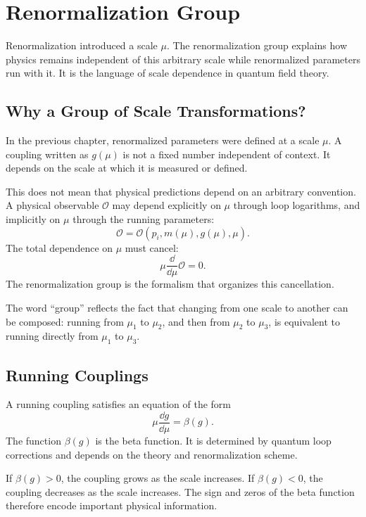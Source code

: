 \chapter{Renormalization Group}

\begin{remarkbox}
Renormalization introduced a scale \(\mu\). The renormalization group explains
how physics remains independent of this arbitrary scale while renormalized
parameters run with it. It is the language of scale dependence in quantum field
theory.
\end{remarkbox}

\section{Why a Group of Scale Transformations?}

In the previous chapter, renormalized parameters were defined at a scale
\(\mu\). A coupling written as \(g(\mu)\) is not a fixed number independent of
context. It depends on the scale at which it is measured or defined.

This does not mean that physical predictions depend on an arbitrary convention.
A physical observable \(\mathcal{O}\) may depend explicitly on \(\mu\) through
loop logarithms, and implicitly on \(\mu\) through the running parameters:
\[
    \mathcal{O}=\mathcal{O}(p_i,m(\mu),g(\mu),\mu).
\]
The total dependence on \(\mu\) must cancel:
\[
    \mu\frac{\dd}{\dd\mu}\mathcal{O}=0.
\]
The renormalization group is the formalism that organizes this cancellation.

The word ``group'' reflects the fact that changing from one scale to another can
be composed: running from \(\mu_1\) to \(\mu_2\), and then from \(\mu_2\) to
\(\mu_3\), is equivalent to running directly from \(\mu_1\) to \(\mu_3\).

\section{Running Couplings}

A running coupling satisfies an equation of the form
\[
    \mu\frac{\dd g}{\dd\mu}=\beta(g).
\]
The function \(\beta(g)\) is the beta function. It is determined by quantum loop
corrections and depends on the theory and renormalization scheme.

If \(\beta(g)>0\), the coupling grows as the scale increases. If
\(\beta(g)<0\), the coupling decreases as the scale increases. The sign and
zeros of the beta function therefore encode important physical information.

